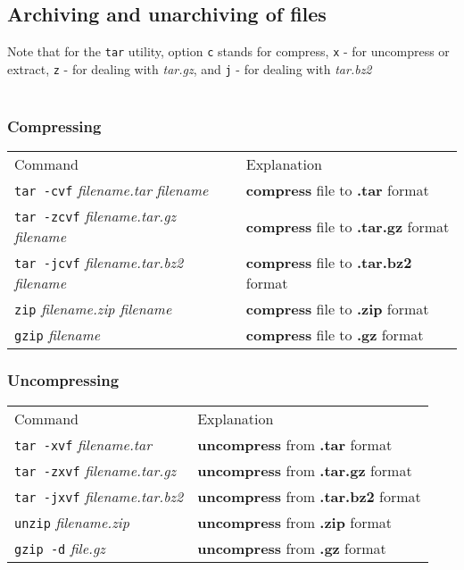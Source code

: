 \documentclass{article}
\begin{document}
\subsection{Archiving and unarchiving of files}
Note that for the \texttt{tar} utility, option \texttt{c} stands for compress, 
\texttt{x} - for uncompress or extract, \texttt{z} - for dealing with \textit{tar.gz},
and \texttt{j} - for dealing with \textit{tar.bz2}\\~\\
\subsubsection{Compressing}
\begin{tabular}{ll}
  Command & Explanation \\
  \hhline{==}
  \texttt{tar -cvf} \textit{filename.tar} \textit{filename} & \textbf{compress} file to \textbf{.tar} format\\
  \texttt{tar -zcvf} \textit{filename.tar.gz} \textit{filename} & \textbf{compress} file to \textbf{.tar.gz} format\\
  \texttt{tar -jcvf} \textit{filename.tar.bz2} \textit{filename} & \textbf{compress} file to \textbf{.tar.bz2} format\\
  \texttt{zip} \textit{filename.zip filename} & \textbf{compress} file to \textbf{.zip} format \\
  \texttt{gzip} \textit{filename} & \textbf{compress} file to \textbf{.gz} format \\
\end{tabular}

\subsubsection{Uncompressing}
\begin{tabular}{ll}
  Command & Explanation \\
  \hhline{==}
  \texttt{tar -xvf} \textit{filename.tar} & \textbf{uncompress} from \textbf{.tar} format \\
  \texttt{tar -zxvf} \textit{filename.tar.gz} & \textbf{uncompress} from \textbf{.tar.gz} format \\
  \texttt{tar -jxvf} \textit{filename.tar.bz2} & \textbf{uncompress} from \textbf{.tar.bz2} format \\
  \texttt{unzip} \textit{filename.zip} & \textbf{uncompress} from \textbf{.zip} format \\
  \texttt{gzip -d} \textit{file.gz} & \textbf{uncompress} from \textbf{.gz} format \\
\end{tabular}
\end{document}
